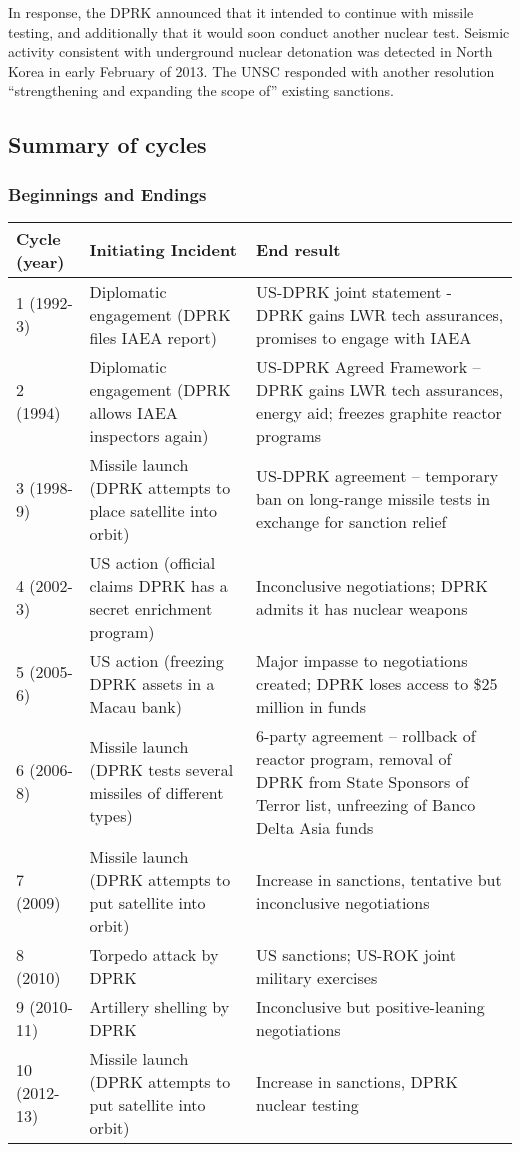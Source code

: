 \documentclass{article}
\begin{document}
In response, the DPRK announced that it intended to continue with missile testing, and additionally that it would soon conduct another nuclear test\cite{davenport}. Seismic activity consistent with underground nuclear detonation was detected in North Korea in early February of 2013\cite{davenport}. The UNSC responded with another resolution “strengthening and expanding the scope of” existing sanctions\cite{unsc13m}.

\subsection{Summary of cycles}
\subsubsection{Beginnings and Endings}
\begin{tabular}{|l|p{6cm}|p{6cm}|}
	\hline
	Cycle (year) & Initiating Incident & End result \\ 
	\hline
	1 (1992-3) & Diplomatic engagement (DPRK files IAEA report) & US-DPRK joint statement - DPRK gains LWR tech assurances, promises to engage with IAEA \\ 
	\hline
	2 (1994) & Diplomatic engagement (DPRK allows IAEA inspectors again) & US-DPRK Agreed Framework – DPRK gains LWR tech assurances, energy aid; freezes graphite reactor programs \\ 
	\hline
	3 (1998-9) & Missile launch (DPRK attempts to place satellite into orbit) & US-DPRK agreement – temporary ban on long-range missile tests in exchange for sanction relief \\ 
	\hline
	4 (2002-3) & US action (official claims DPRK has a secret enrichment program) & Inconclusive negotiations; DPRK admits it has nuclear weapons \\ 
	\hline
	5 (2005-6) & US action (freezing DPRK assets in a Macau bank) & Major impasse to negotiations created; DPRK loses access to \$25 million in funds \\ 
	\hline
	6 (2006-8) & Missile launch (DPRK tests several missiles of different types) & 6-party agreement – rollback of reactor program, removal of DPRK from State Sponsors of Terror list, unfreezing of Banco Delta Asia funds \\ 
	\hline
	7 (2009) & Missile launch (DPRK attempts to put satellite into orbit) & Increase in sanctions, tentative but inconclusive negotiations \\ 
	\hline
	8 (2010) & Torpedo attack by DPRK & US sanctions; US-ROK joint military exercises \\ 
	\hline
	9 (2010-11) & Artillery shelling by DPRK & Inconclusive but positive-leaning negotiations \\ 
	\hline
	10 (2012-13) & Missile launch (DPRK attempts to put satellite into orbit) & Increase in sanctions, DPRK nuclear testing \\
	\hline
	\end{tabular}
\end{document}
